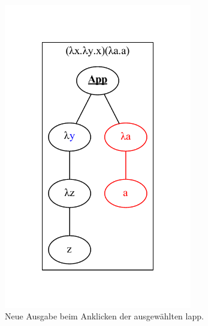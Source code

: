 \documentclass[parskip=full,11pt,twoside]{scrartcl}
\begin{document}
{\begin{figure}[H]
\begin{subfigure}{0.25\textwidth}
		\includegraphics[width=0.9\textwidth]{img/displayTree3}
		\caption{\label{fig:ltAppTreeB}Neue Ausgabe beim Anklicken der ausgewählten \gls{lapp}.}
	\end{subfigure}
	\hspace*{\fill}
	\begin{subfigure}{0.25\textwidth}
		\centering

\end{subfigure}
\end{figure}}
\end{document}
